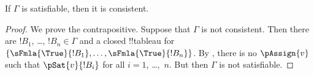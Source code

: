\begin{cor}
If $\Gamma$ is satisfiable, then it is consistent.
\end{cor}

\begin{proof}
We prove the contrapositive.  Suppose that $\Gamma$ is not consistent.
Then there are $!B_1$, \dots, $!B_n \in \Gamma$ and a closed
!!{tableau} for $\{\sFmla{\True}{!B_1}, \dots, \sFmla{\True}{!B_n}\}$.  By
, there is no
$\pAssign{v}$ such that
$\pSat{v}{!B_i}$ for all $i=1$, \dots,~$n$.  But
then $\Gamma$ is not satisfiable.
\end{proof}





\OLEndChapterHook





  

